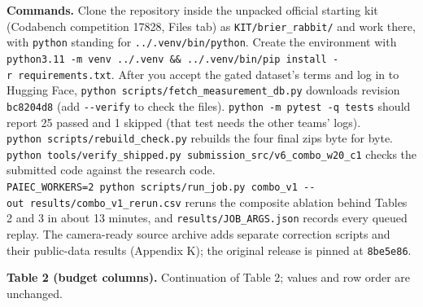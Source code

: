 \documentclass[
]{article}
\begin{document}
\textbf{Commands.} Clone the repository inside the unpacked official
starting kit (Codabench competition 17828, Files tab) as
\texttt{KIT/brier\_rabbit/} and work there, with \texttt{python}
standing for \texttt{../.venv/bin/python}. Create the environment with
\texttt{python3.11\ -m\ venv\ ../.venv\ \&\&\ ../.venv/bin/pip\ install\ -r\ requirements.txt}.
After you accept the gated dataset's terms and log in to Hugging Face,
\texttt{python\ scripts/fetch\_measurement\_db.py} downloads revision
\texttt{bc8204d8} (add \texttt{-\/-verify} to check the files).
\texttt{python\ -m\ pytest\ -q\ tests} should report 25 passed and 1
skipped (that test needs the other teams' logs).
\texttt{python\ scripts/rebuild\_check.py} rebuilds the four final zips
byte for byte.
\texttt{python\ tools/verify\_shipped.py\ submission\_src/v6\_combo\_w20\_c1}
checks the submitted code against the research code.
\texttt{PAIEC\_WORKERS=2\ python\ scripts/run\_job.py\ combo\_v1\ -\/-out\ results/combo\_v1\_rerun.csv}
reruns the composite ablation behind Tables 2 and 3 in about 13 minutes,
and \texttt{results/JOB\_ARGS.json} records every queued replay. The
camera-ready source archive adds separate correction scripts and their
public-data results (Appendix K); the original release is pinned at
\texttt{8be5e86}.

\textbf{Table 2 (budget columns).} Continuation of Table 2; values and
row order are unchanged.
\end{document}
